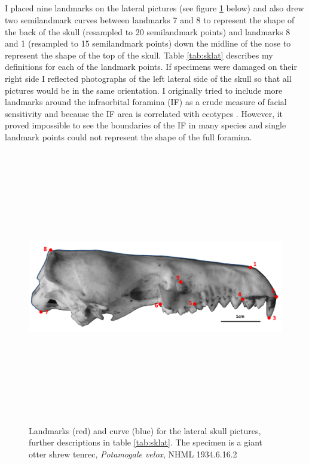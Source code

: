 \subsection{}
	I placed nine landmarks on the lateral pictures (see figure \ref{fig:sklat_landmarks} below) and also drew two semilandmark curves between landmarks 7 and 8 to represent the shape of the back of the skull (resampled to 20 semilandmark points) and landmarks 8 and 1 (resampled to 15 semilandmark points) down the midline of the nose to represent the shape of the top of the skull. Table \ref{tab:sklat} describes my definitions for each of the landmark points.
	If specimens were damaged on their right side I reflected photographs of the left lateral side of the skull so that all pictures would be in the same orientation.
	I originally tried to include more landmarks around the infraorbital foramina (IF) as a crude measure of facial sensitivity and because the IF area is correlated with ecotypes \citep{Crumpton2012}. However, it proved impossible to see the boundaries of the IF in many species and single landmark points could not represent the shape of the full foramina. 

\begin{figure}[!htb] 
  \centering
  \includegraphics[width=12cm, height=12cm, keepaspectratio=true]
  {Methods/figures/sklat_landmarks_pot_vel.png}
    \caption[Skulls: lateral landmarks] {Landmarks (red) and curve (blue) for the lateral skull pictures, further descriptions in table \ref{tab:sklat}. The specimen is a giant otter shrew tenrec, \textit{Potamogale velox}, NHML 1934.6.16.2}
  \label{fig:sklat_landmarks}
  \end{figure}

